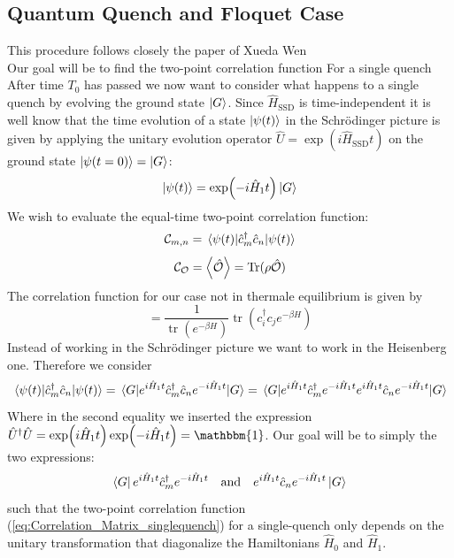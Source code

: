 \documentclass[11pt, a4paper]{article}
\theoremstyle{definition} %
\begin{document}
	\subsection{Quantum Quench and Floquet Case}
	This procedure follows closely the paper of Xueda Wen \\
	
	Our goal will be to find the two-point correlation function
	For a single quench  \cite{Xueda}
	After time $T_0$ has passed we now want to consider what happens to a single quench by evolving the ground state $\ket{G}$. Since $\hat{H}_\text{SSD}$ is time-independent it is well know that the time evolution of a state $\ket{\psi(t)}$ in the Schrödinger picture is given by applying the unitary evolution operator $\hat{U} = \exp(i\hat{H}_\text{SSD} t)$ on the ground state $\ket{\psi(t=0)} = \ket{G}$:
	\begin{equation}
		\ket{\psi(t)} = \exp(-i \hat{H}_1 t) \ket{G}
	\end{equation}
	We wish to evaluate the equal-time two-point correlation function:
	\begin{equation}
	\mathcal{C}_{m,n} = \mel{\psi(t)}{\hat{c}_m^\dagger \hat{c}_n}{\psi(t)}	
	\end{equation}
	\begin{equation}
		\mathcal{C}_{\mathcal{O}} = \expval{\hat{\mathcal{O}}} = \text{Tr}(\rho \hat{\mathcal{O}})
	\end{equation}
	The correlation function for our case not in thermale equilibrium is given by
	\begin{equation}
		 = \frac{1}{\operatorname{tr}\left(e^{-\beta H}\right)} \operatorname{tr}\left(c_{i}^{\dagger} c_{j} e^{-\beta H}\right)
	\end{equation}
Instead of working in the Schrödinger picture we want to work in the Heisenberg one. Therefore we consider
	\begin{equation}
		\mel{\psi(t)}{\hat{c}_m^\dagger \hat{c}_n}{\psi(t)} = \mel{G}{e^{i \hat{H}_1 t} \hat{c}_m^\dagger \hat{c}_n e^{-i \hat{H}_1 t}}{G} = \mel{G}{e^{i\hat{H}_1 t} \hat{c}_m^\dagger e^{-i \hat{H}_1 t} e^{i \hat{H}_1 t} \hat{c}_n e^{-i\hat{H}_1 t}}{G}
		\label{eq:Correlation_Matrix_singlequench}
	\end{equation}
	Where in the second equality we inserted the expression $\hat{U}^\dagger \hat{U} = \exp(i \hat{H}_1 t)\exp(-i \hat{H}_1 t) = \mathbbm{1}$. Our goal will be to simply the two expressions:
	\begin{equation}
		\bra{G} e^{i\hat{H}_1 t} \hat{c}_m^\dagger e^{-i \hat{H}_1 t} \qq{and}  e^{i \hat{H}_1 t} \hat{c}_n e^{-i\hat{H}_1 t}\ket{G}
	\end{equation}
	such that the two-point correlation function (\ref{eq:Correlation_Matrix_singlequench}) for a single-quench only depends on the unitary transformation that diagonalize the Hamiltonians $\hat{H}_0$ and $\hat{H}_1$. \\
	
\end{document}
